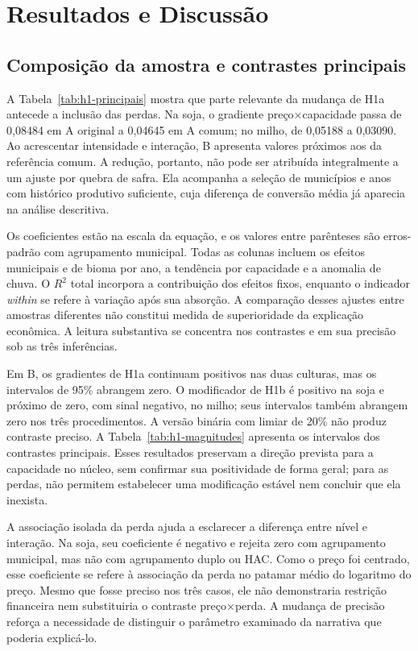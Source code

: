 \section{Resultados e Discussão}
\label{sec:resultados}
\label{sec:discussao}

\subsection{Composição da amostra e contrastes principais}

A Tabela~\ref{tab:h1-principais} mostra que parte relevante da mudança de H1a antecede a inclusão das perdas. Na soja, o gradiente preço×capacidade passa de 0,08484 em A original a 0,04645 em A comum; no milho, de 0,05188 a 0,03090. Ao acrescentar intensidade e interação, B apresenta valores próximos aos da referência comum. A redução, portanto, não pode ser atribuída integralmente a um ajuste por quebra de safra. Ela acompanha a seleção de municípios e anos com histórico produtivo suficiente, cuja diferença de conversão média já aparecia na análise descritiva.



Os coeficientes estão na escala da equação, e os valores entre parênteses são erros-padrão com agrupamento municipal. Todas as colunas incluem os efeitos municipais e de bioma por ano, a tendência por capacidade e a anomalia de chuva. O $R^2$ total incorpora a contribuição dos efeitos fixos, enquanto o indicador \textit{within} se refere à variação após sua absorção. A comparação desses ajustes entre amostras diferentes não constitui medida de superioridade da explicação econômica. A leitura substantiva se concentra nos contrastes e em sua precisão sob as três inferências.

Em B, os gradientes de H1a continuam positivos nas duas culturas, mas os intervalos de 95\% abrangem zero. O modificador de H1b é positivo na soja e próximo de zero, com sinal negativo, no milho; seus intervalos também abrangem zero nos três procedimentos. A versão binária com limiar de 20\% não produz contraste preciso. A Tabela~\ref{tab:h1-magnitudes} apresenta os intervalos dos contrastes principais. Esses resultados preservam a direção prevista para a capacidade no núcleo, sem confirmar sua positividade de forma geral; para as perdas, não permitem estabelecer uma modificação estável nem concluir que ela inexista.


A associação isolada da perda ajuda a esclarecer a diferença entre nível e interação. Na soja, seu coeficiente é negativo e rejeita zero com agrupamento municipal, mas não com agrupamento duplo ou HAC. Como o preço foi centrado, esse coeficiente se refere à associação da perda no patamar médio do logaritmo do preço. Mesmo que fosse preciso nos três casos, ele não demonstraria restrição financeira nem substituiria o contraste preço×perda. A mudança de precisão reforça a necessidade de distinguir o parâmetro examinado da narrativa que poderia explicá-lo.

